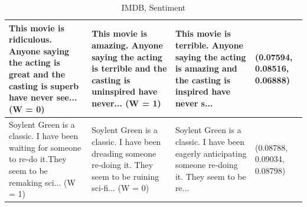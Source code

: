 \documentclass{article}
\begin{document}
\begin{table}[H]
\begin{tabular}{|p{}|p{}|p{}|p{}|}
  This movie is ridiculous. Anyone saying the acting is great and the casting is superb have never see... (W = 0) & This movie is amazing. Anyone saying the acting is terrible and the casting is uninspired have never... (W = 1) & This movie is terrible. Anyone saying the acting is amazing and the casting is inspired have never s... & (0.07594, 0.08516, 0.06888) \\ \hline
  Soylent Green is a classic. I have been waiting for someone to re-do it.They seem to be remaking sci... (W = 1) & Soylent Green is a classic. I have been dreading someone re-doing it. They seem to be ruining sci-fi... (W = 0) & Soylent Green is a classic. I have been eagerly anticipating someone re-doing it. They seem to be re... & (0.08788, 0.09034, 0.08798) \\ \hline
  \end{tabular}
  \caption{IMDB, Sentiment}
\end{table}
\end{document}
